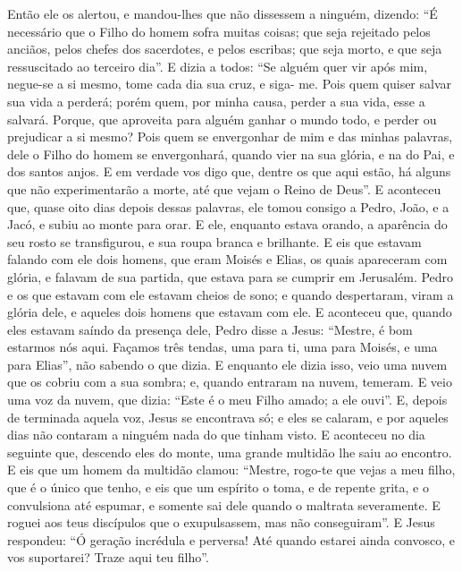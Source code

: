 {  Então ele os alertou, e mandou-lhes que não dissessem a ninguém,
  dizendo: “É necessário que o Filho do homem sofra muitas coisas; que seja rejeitado pelos anciãos, pelos chefes dos sacerdotes, e pelos escribas; que seja morto, e que seja ressuscitado ao terceiro dia”.
  E dizia a todos: “Se alguém quer vir após mim, negue-se a si mesmo, tome cada dia sua cruz, e siga- me.
  Pois quem quiser salvar sua vida a perderá; porém quem, por minha causa, perder a sua vida, esse a salvará.
  Porque, que aproveita para alguém ganhar o mundo todo, e perder ou prejudicar a si mesmo?
  Pois quem se envergonhar de mim e das minhas palavras, dele o Filho do homem se envergonhará, quando vier na sua glória, e na do Pai, e dos santos anjos.
  E em verdade vos digo que, dentre os que aqui estão, há alguns que não experimentarão a morte, até que vejam o Reino de Deus”.
  E aconteceu que, quase oito dias depois dessas palavras, ele tomou consigo a Pedro, João, e a Jacó, e subiu ao monte para orar.
  E ele, enquanto estava orando, a aparência do seu rosto se transfigurou, e sua roupa
{} branca e brilhante.
  E eis que estavam falando com ele dois homens, que eram Moisés e Elias,
  os quais apareceram com glória, e falavam de sua partida, que estava para se cumprir em Jerusalém.
  Pedro e os que estavam com ele estavam cheios de sono; e quando despertaram, viram a glória dele, e aqueles dois homens que estavam com ele.
  E aconteceu que, quando eles estavam saíndo da presença dele, Pedro disse a Jesus: “Mestre, é bom estarmos nós aqui. Façamos três tendas, uma para ti, uma para Moisés, e uma para Elias”, não sabendo o que dizia.
  E enquanto ele dizia isso, veio uma nuvem que os cobriu com a sua sombra; e, quando entraram na nuvem, temeram.
  E veio uma voz da nuvem, que dizia: “Este é o meu Filho amado; a ele ouvi”.
  E, depois de terminada aquela voz, Jesus se encontrava só; e eles se calaram, e por aqueles dias não contaram a ninguém nada do que tinham visto.
  E aconteceu no dia seguinte que, descendo eles do monte, uma grande multidão lhe saiu ao encontro.
  E eis que um homem da multidão clamou: “Mestre, rogo-te que vejas a meu filho, que é o único que tenho,
  e eis que um espírito o toma, e de repente grita, e o convulsiona até espumar, e somente sai dele quando o maltrata severamente.
  E roguei aos teus discípulos que o exupulsassem, mas não conseguiram”.
  E Jesus respondeu: “Ó geração incrédula e perversa! Até quando estarei ainda convosco, e vos suportarei? Traze aqui teu filho”.
}
